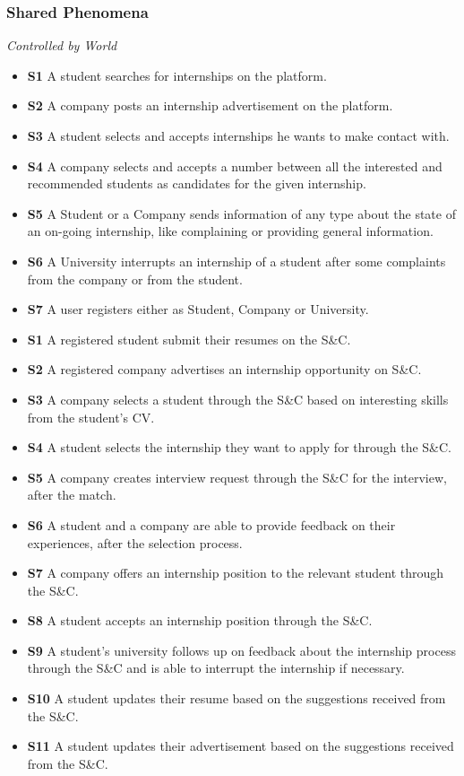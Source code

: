 \documentclass{article}
\begin{document}
\subsubsection{Shared Phenomena}
    \textit{Controlled by World}
    \begin{itemize}
        \item \textbf{S1} A student searches for internships on the platform.
        \item \textbf{S2} A company posts an internship advertisement on the platform.
        \item \textbf{S3} A student selects and accepts internships he wants to make contact with.
        \item \textbf{S4} A company selects and accepts a number between all the interested and recommended students as candidates for the given internship.
        \item \textbf{S5} A Student or a Company sends information of any type about the state of an on-going internship, like complaining or providing general information.
        \item \textbf{S6} A University interrupts an internship of a student after some complaints from the company or from the student. 
        \item \textbf{S7} A user registers either as Student, Company or University.
        
        \item \textbf{S1} A registered student submit their resumes on the S\&C.
        \item \textbf{S2} A registered company advertises an internship opportunity on S\&C.
        \item \textbf{S3} A company selects a student through the S\&C based on interesting skills from the student's CV. 
        \item \textbf{S4} A student selects the internship they want to apply for through the S\&C.
        \item \textbf{S5} A company creates interview request through the S\&C for the interview, after the match.
        \item \textbf{S6} A student and a company are able to provide feedback on their experiences, after the selection process.
        \item \textbf{S7} A company offers an internship position to the relevant student through the S\&C.
        \item \textbf{S8} A student accepts an internship position through the S\&C.
        \item \textbf{S9} A student's university follows up on feedback about the internship process through the S\&C and is able to interrupt the internship if necessary.
        \item \textbf{S10} A student updates their resume based on the suggestions received from the S\&C.
        \item \textbf{S11} A student updates their advertisement based on the suggestions received from the S\&C.
    \end{itemize}
\end{document}

